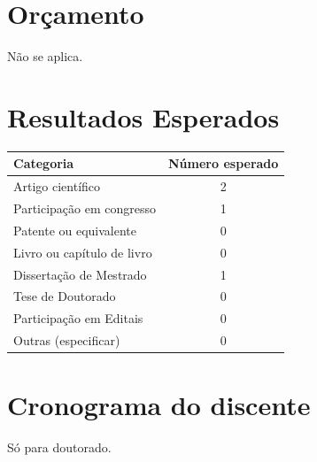 \documentclass[12pt, a4paper, twoside]{article}
\begin{document}
\newpage

\section{Orçamento}

Não se aplica.

\section{Resultados Esperados}

\begin{table}[H]
\begin{tabular}{lc}
\hline
\textbf{Categoria} & \textbf{Número esperado} \\ \hline
Artigo científico & 2 \\
Participação em congresso & 1 \\
Patente ou equivalente & 0 \\
Livro ou capítulo de livro & 0 \\
Dissertação de Mestrado & 1 \\ 
Tese de Doutorado & 0 \\ 
Participação em Editais & 0 \\ 
Outras (especificar) & 0 \\ \hline
\end{tabular}
\end{table}

\section{Cronograma do discente}

\begin{table}[H]
\centering
{}
\end{table}

\noindent * Só para doutorado.

\newpage

\end{document}
